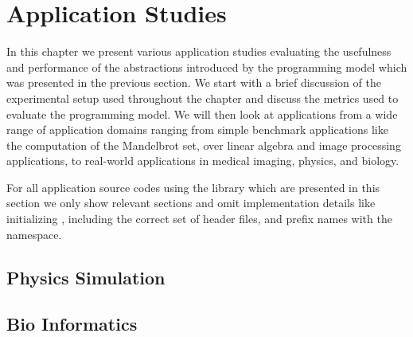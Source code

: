 \chapter{Application Studies}
\label{chapter:skelcl-evaluation}

In this chapter we present various application studies evaluating the usefulness and performance of the abstractions introduced by the \SkelCL programming model which was presented in the previous section.
We start with a brief discussion of the experimental setup used throughout the chapter and discuss the metrics used to evaluate the \SkelCL programming model.
We will then look at applications from a wide range of application domains ranging from simple benchmark applications like the computation of the Mandelbrot set, over linear algebra and image processing applications, to real-world applications in medical imaging, physics, and biology.

For all application source codes using the \SkelCL library which are presented in this section we only show relevant sections and omit implementation details like initializing \SkelCL, including the correct set of header files, and prefix names with the  namespace.











\section{Physics Simulation}

\section{Bio Informatics}

